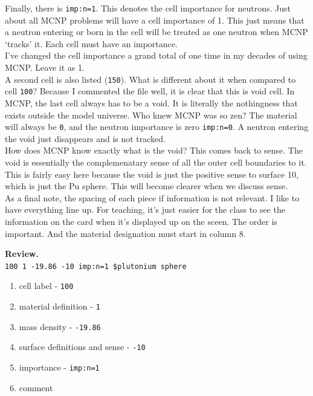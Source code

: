 \documentclass[11pt,a4paper]{article}
\begin{document}
\noindent Finally, there is \texttt{imp:n=1}. This denotes the cell importance for neutrons. Just about all MCNP problems will have a cell importance of 1. This just means that a neutron entering or born in the cell will be treated as one neutron when MCNP `tracks' it. Each cell must have an importance. \\

\noindent I've changed the cell importance a grand total of one time in my decades of using MCNP. Leave it as 1. \\

\noindent A second cell is also listed (\texttt{150}). What is different about it when compared to cell \texttt{100}? Because I commented the file well, it is clear that this is void cell. In MCNP, the last cell always has to be a void. It is literally the nothingness that exists outside the model universe. Who knew MCNP was so zen? The material will always be \texttt{0}, and the neutron importance is zero \texttt{imp:n=0}. A neutron entering the void just disappears and is not
tracked. \\

\noindent How does MCNP know exactly what is the void? This comes back to sense. The void is essentially the complemenatary sense of all the outer cell boundaries to it. This is fairly easy here because the void is just the positive sense to surface 10, which is just the Pu sphere. This will become clearer when we discuss sense. \\

\noindent As a final note, the spacing of each piece if information is not relevant. I like to have everything line up. For teaching, it's just easier for the class to see the information on the card when it's displayed up on the sceen. The order is important. And the material designation must start in column 8.

\noindent\textbf{Review.}\\
\noindent\texttt{100    1 -19.86       -10       imp:n=1       \$plutonium sphere}\\

\begin{enumerate}[topsep=0pt,itemsep=-1ex,partopsep=1ex,parsep=1ex]
    \item cell label - \texttt{100}
    \item material definition - \texttt{1}
    \item mass density - \texttt{-19.86}
    \item surface definitions and sense - \texttt{-10}
    \item importance - \texttt{imp:n=1}
    \item comment
\end{enumerate}
\vspace*{\baselineskip}
\end{document}
